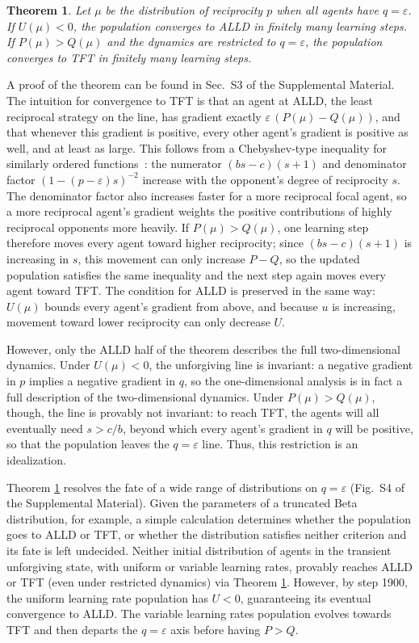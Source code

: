 \documentclass[10pt]{article}
\newtheorem{theorem}{Theorem}
\newcommand{\eps}{\varepsilon}
\begin{document}
\begin{theorem}
Let $\mu$ be the distribution of reciprocity $p$ when all agents have $q = \eps$. If $U(\mu) < 0$, the population converges to ALLD in finitely many learning steps. If $P(\mu) > Q(\mu)$ and the dynamics are restricted to $q = \eps$, the population converges to TFT in finitely many learning steps.
\label{thm:TUS}
\end{theorem}
\noindent A proof of the theorem can be found in Sec.~S3 of the Supplemental Material. The intuition for convergence to TFT is that an agent at ALLD, the least reciprocal strategy on the line, has gradient exactly $\eps\,(P(\mu) - Q(\mu))$, and that whenever this gradient is positive, every other agent's gradient is positive as well, and at least as large. This follows from a Chebyshev-type inequality for similarly ordered functions~\cite{wagener2006-ChebyshevsAlgebraicInequality}: the numerator $(bs-c)(s+1)$ and denominator factor $(1-(p-\eps)s)^{-2}$ increase with the opponent's degree of reciprocity $s$. The denominator factor also increases faster for a more reciprocal focal agent, so a more reciprocal agent's gradient weights the positive contributions of highly reciprocal opponents more heavily. If $P(\mu) > Q(\mu)$, one learning step therefore moves every agent toward higher reciprocity; since $(bs-c)(s+1)$ is increasing in $s$, this movement can only increase $P - Q$, so the updated population satisfies the same inequality and the next step again moves every agent toward TFT. The condition for ALLD is preserved in the same way: $U(\mu)$ bounds every agent's gradient from above, and because $u$ is increasing, movement toward lower reciprocity can only decrease $U$.

However, only the ALLD half of the theorem describes the full two-dimensional dynamics. Under $U(\mu)<0$, the unforgiving line is invariant: a negative gradient in $p$ implies a negative gradient in $q$, so the one-dimensional analysis is in fact a full description of the two-dimensional dynamics. Under $P(\mu)>Q(\mu)$, though, the line is provably not invariant: to reach TFT, the agents will all eventually need $s > c/b$, beyond which every agent's gradient in $q$ will be positive, so that the population leaves the $q=\eps$ line. Thus, this restriction is an idealization.

Theorem \ref{thm:TUS} resolves the fate of a wide range of distributions on $q = \eps$ (Fig.~S4 of the Supplemental Material). Given the parameters of a truncated Beta distribution, for example, a simple calculation determines whether the population goes to ALLD or TFT, or whether the distribution satisfies neither criterion and its fate is left undecided. Neither initial distribution of agents in the transient unforgiving state, with uniform or variable learning rates, provably reaches ALLD or TFT (even under restricted dynamics) via Theorem \ref{thm:TUS}. However, by step 1900, the uniform learning rate population has $U < 0$, guaranteeing its eventual convergence to ALLD. The variable learning rates population evolves towards TFT and then departs the $q = \eps$ axis before having $P > Q$.
\end{document}
